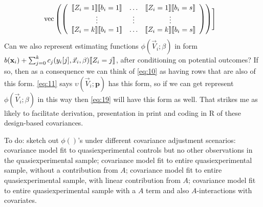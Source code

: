 \documentclass{article}
\DeclarePairedDelimiter{\indicator}{\llbracket}{\rrbracket}
\newcommand{\absorbInterceptsEF}{\upsilon}
\begin{document}
\begin{align}
  &\operatorname{vec}\left(%
                                                 \left(
                                                 \begin{array}{ccc}
                                                   \indicator{Z_{i}=1}\indicator{b_{i}=1}&\ldots&\indicator{Z_{i}=1}\indicator{b_{i}=s}\\
                                                   \vdots & \vdots &
                                                                     \vdots
                                                   \\
                                                   \indicator{Z_{i}=k}\indicator{b_{i}=1}&\ldots&\indicator{Z_{i}=k}\indicator{b_{i}=s}\\
                                                 \end{array}
  \right)%
  \right)
    \Biggr] \label{eq:11}
\end{align}
Can we also represent estimating functions
$\phi(\vec{V}_{i}; \beta)$ in form
$b(\mathbf{x}_{i}) + \sum_{j=0}^{k}c_{j}(y_{i}[j], \vec{x}_{i}, \beta)\indicator{Z_{i}=j}$, after conditioning
on potential outcomes? If so, then as a consequence we can think of
\eqref{eq:10} as having rows that are also of this form.
\eqref{eq:11} says $\absorbInterceptsEF(\vec{V}_{i}; \mathbf{p})$
has this form, so if we can get represent
$\phi(\vec{V}_{i}; \beta)$ in this way then \eqref{eq:19}
will have this form as well. That strikes me as likely to facilitate
derivation,
presentation in print and coding in R of these design-based covariances.

To do:
sketch out $\phi()$'s under different covariance adjustment scenarios:
covariance model fit to quasiexperimental controls but no other
observations in the quasiexperimental sample; covariance model fit to
entire quasiexperimental sample, without a contribution from $A$;
covariance model fit to entire quasiexperimental sample, with linear
contribution from $A$; covariance model fit to entire
quasiexperimental sample with a $A$ term and also $A$-interactions
with covariates.

\end{document}
